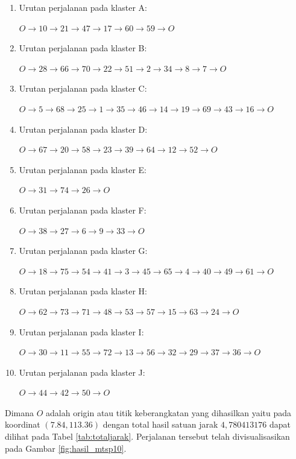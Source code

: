 \begin{enumerate}
\item Urutan perjalanan pada klaster A:

$O \to 10 \to 21 \to 47 \to 17 \to 60 \to 59 \to O$

\item Urutan perjalanan pada klaster B:

$O \to 28 \to 66 \to 70 \to 22 \to 51 \to 2 \to 34 \to 8 \to 7 \to O$

\item Urutan perjalanan pada klaster C:

$O \to 5 \to 68 \to 25 \to 1 \to 35 \to 46 \to 14 \to 19 \to 69 \to 43 \to 16 \to O$

\item Urutan perjalanan pada klaster D:

$O \to 67 \to 20 \to 58 \to 23 \to 39 \to 64 \to 12 \to 52 \to O$

\item Urutan perjalanan pada klaster E:

$O \to 31 \to 74 \to 26 \to O$

\item Urutan perjalanan pada klaster F:

$O \to 38 \to 27 \to 6 \to 9 \to 33 \to O$

\item Urutan perjalanan pada klaster G:

$O \to 18 \to 75 \to 54 \to 41 \to 3 \to 45 \to 65 \to 4 \to 40 \to 49 \to 61 \to O$

\item Urutan perjalanan pada klaster H:

$O \to 62 \to 73 \to 71 \to 48 \to 53 \to 57 \to 15 \to 63 \to 24 \to O$

\item Urutan perjalanan pada klaster I:

$O \to 30 \to 11 \to 55 \to 72 \to 13 \to 56 \to 32 \to 29 \to 37 \to 36 \to O$

\item Urutan perjalanan pada klaster J:

$O \to 44 \to 42 \to 50 \to O$

\end{enumerate}

Dimana $O$ adalah origin atau titik keberangkatan yang dihasilkan yaitu pada koordinat $(7.84, 113.36)$ dengan total hasil satuan jarak $4,780413176$ dapat dilihat pada Tabel \ref{tab:totaljarak}. Perjalanan tersebut telah divisualisasikan pada Gambar \ref{fig:hasil_mtsp10}.


